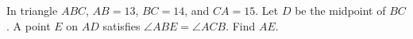 In triangle $ABC$, $AB=13$, $BC=14$, and $CA=15$. Let $D$ be the midpoint of $BC$. A point $E$ on $AD$ satisfies $\angle ABE=\angle ACB$. Find $AE$.

